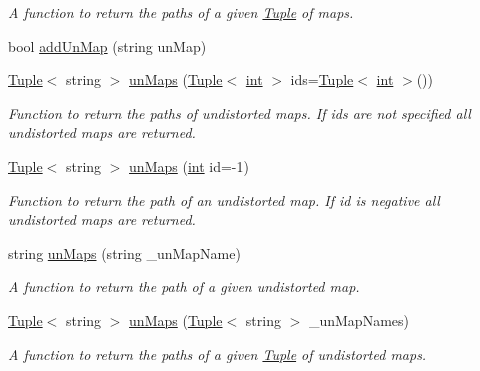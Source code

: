 \begin{DoxyCompactItemize}
\begin{DoxyCompactList}\small\item\em A function to return the paths of a given \mbox{\hyperlink{class_tuple}{Tuple}} of maps. \end{DoxyCompactList}\item 
bool \mbox{\hyperlink{class_settings_aeee4537bd39c18ca3a711a73c9c2277e}{add\+Un\+Map}} (string un\+Map)
\item 
\mbox{\hyperlink{class_tuple}{Tuple}}$<$ string $>$ \mbox{\hyperlink{class_settings_a7cbf0234eaca6582ce982f0cf756d282}{un\+Maps}} (\mbox{\hyperlink{class_tuple}{Tuple}}$<$ \mbox{\hyperlink{draw_8hh_aa620a13339ac3a1177c86edc549fda9b}{int}} $>$ ids=\mbox{\hyperlink{class_tuple}{Tuple}}$<$ \mbox{\hyperlink{draw_8hh_aa620a13339ac3a1177c86edc549fda9b}{int}} $>$())
\begin{DoxyCompactList}\small\item\em Function to return the paths of undistorted maps. If ids are not specified all undistorted maps are returned. \end{DoxyCompactList}\item 
\mbox{\hyperlink{class_tuple}{Tuple}}$<$ string $>$ \mbox{\hyperlink{class_settings_a0619c378aff05b5762afe0280b40e07a}{un\+Maps}} (\mbox{\hyperlink{draw_8hh_aa620a13339ac3a1177c86edc549fda9b}{int}} id=-\/1)
\begin{DoxyCompactList}\small\item\em Function to return the path of an undistorted map. If id is negative all undistorted maps are returned. \end{DoxyCompactList}\item 
string \mbox{\hyperlink{class_settings_a6e62c5eb18f6abc4bcbcd11e018fda8b}{un\+Maps}} (string \+\_\+un\+Map\+Name)
\begin{DoxyCompactList}\small\item\em A function to return the path of a given undistorted map. \end{DoxyCompactList}\item 
\mbox{\hyperlink{class_tuple}{Tuple}}$<$ string $>$ \mbox{\hyperlink{class_settings_aa89550d142cb4101faf35af214f4edff}{un\+Maps}} (\mbox{\hyperlink{class_tuple}{Tuple}}$<$ string $>$ \+\_\+un\+Map\+Names)
\begin{DoxyCompactList}\small\item\em A function to return the paths of a given \mbox{\hyperlink{class_tuple}{Tuple}} of undistorted maps. \end{DoxyCompactList}\item 

\end{DoxyCompactItemize}
